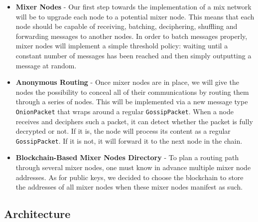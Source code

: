 \documentclass[11pt, a4paper]{article}
\begin{document}
\begin{itemize}
        \item \textbf{Mixer Nodes} -
        Our first step towards the implementation of a mix network will be to upgrade each node to a potential mixer node.
        This means that each node should be capable of receiving, batching, deciphering, shuffling and forwarding messages to another nodes.
        In order to batch messages properly, mixer nodes will implement a simple threshold policy: waiting until a constant number of messages has been reached and then simply outputting a message at random.

        \item \textbf{Anonymous Routing} -
        Once mixer nodes are in place, we will give the nodes the possibility to conceal all of their communications by routing them through a series of nodes.
        This will be implemented via a new message type \texttt{OnionPacket} that wraps around a regular \texttt{GossipPacket}.
        When a node receives and deciphers such a packet, it can detect whether the packet is fully decrypted or not.
        If it is, the node will process its content as a regular \texttt{GossipPacket}.
        If it is not, it will forward it to the next node in the chain.

        \item \textbf{Blockchain-Based Mixer Nodes Directory} -
        To plan a routing path through several mixer nodes, one must know in advance multiple mixer node addresses.
        As for public keys, we decided to choose the blockchain to store the addresses of all mixer nodes when these mixer nodes manifest as such.

        \end{itemize}

    \subsection{Architecture}


\end{document}
